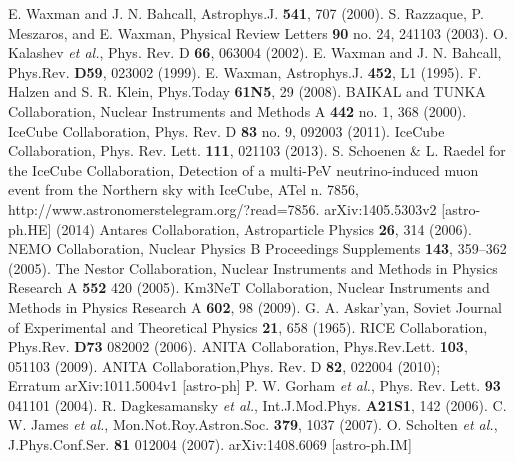 \begin{thebibliography}{1}
 E. Waxman and J. N. Bahcall, Astrophys.J. \textbf{541}, 707 (2000).
 S. Razzaque, P. Meszaros, and E. Waxman, Physical Review Letters \textbf{90} no. 24, 241103 (2003).
 O. Kalashev {\it et al.}, Phys. Rev. D \textbf{66}, 063004 (2002).
 E. Waxman and J. N. Bahcall, Phys.Rev. \textbf{D59},  023002 (1999).
  E. Waxman,  Astrophys.J. \textbf{452},  L1 (1995).
 F. Halzen and S. R. Klein, Phys.Today \textbf{61N5}, 29 (2008).
 BAIKAL and TUNKA Collaboration, Nuclear Instruments and Methods A \textbf{442} no. 1, 368 (2000).
 IceCube Collaboration, Phys. Rev. D \textbf{83} no. 9,  092003 (2011).
 IceCube Collaboration, Phys. Rev. Lett. \textbf{111}, 021103 (2013).
 S. Schoenen & L. Raedel for the IceCube Collaboration,
Detection of a multi-PeV neutrino-induced muon event from the Northern sky with IceCube, ATel n. 7856, http://www.astronomerstelegram.org/?read=7856.
 arXiv:1405.5303v2 [astro-ph.HE] (2014)
 Antares Collaboration, Astroparticle Physics \textbf{26}, 314 (2006).
 NEMO Collaboration, Nuclear Physics B Proceedings Supplements \textbf{143},  359–362 (2005).
  The Nestor Collaboration,  Nuclear Instruments and Methods in Physics Research A \textbf{552} 420 (2005).
  Km3NeT Collaboration, Nuclear Instruments and Methods in Physics Research A \textbf{602}, 98 (2009).
  G. A. Askar’yan, Soviet Journal of Experimental and Theoretical Physics \textbf{21}, 658 (1965).
 RICE Collaboration, Phys.Rev. \textbf{D73}  082002 (2006).
 ANITA Collaboration, Phys.Rev.Lett. \textbf{103},  051103 (2009).
ANITA Collaboration,Phys. Rev. D \textbf{82}, 022004 (2010);\\
Erratum arXiv:1011.5004v1 [astro-ph]
  P. W. Gorham {\it et al.},  Phys. Rev. Lett. \textbf{93}  041101 (2004).
 R. Dagkesamansky {\it et al.}, Int.J.Mod.Phys. \textbf{A21S1},  142 (2006).
 C. W. James {\it et al.}, Mon.Not.Roy.Astron.Soc. \textbf{379}, 1037 (2007).
  O. Scholten {\it et al.}, J.Phys.Conf.Ser. \textbf{81}  012004 (2007).
 arXiv:1408.6069 [astro-ph.IM]

\end{thebibliography}
